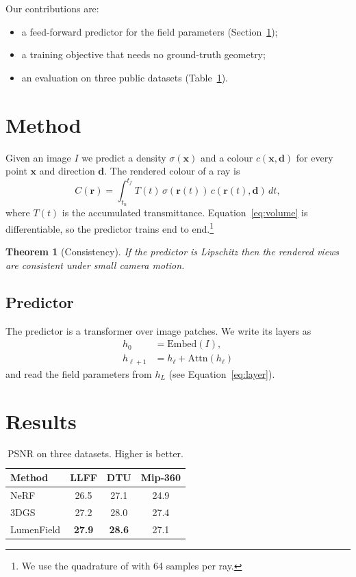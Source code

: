 \documentclass[sigconf]{acmart}
\newcommand{\ours}{LumenField}
\newcommand{\vect}[1]{\mathbf{#1}}
\newtheorem{theorem}{Theorem}
\begin{document}
Our contributions are:
\begin{itemize}
  \item a feed-forward predictor for the field parameters (Section~\ref{sec:method});
  \item a training objective that needs no ground-truth geometry;
  \item an evaluation on three public datasets (Table~\ref{tab:results}).
\end{itemize}

\section{Method}
\label{sec:method}

Given an image $I$ we predict a density $\sigma(\vect{x})$ and a colour
$c(\vect{x}, \vect{d})$ for every point $\vect{x}$ and direction $\vect{d}$. The
rendered colour of a ray is
\begin{equation}
  C(\mathbf{r}) = \int_{t_n}^{t_f} T(t)\,\sigma(\mathbf{r}(t))\,c(\mathbf{r}(t), \mathbf{d})\,dt,
  \label{eq:volume}
\end{equation}
where $T(t)$ is the accumulated transmittance. Equation~\eqref{eq:volume} is
differentiable, so the predictor trains end to end.\footnote{We use the quadrature
of \citet{mildenhall2020nerf} with 64 samples per ray.}

\begin{theorem}[Consistency]
  If the predictor is Lipschitz then the rendered views are consistent under small
  camera motion.
\end{theorem}

\subsection{Predictor}

The predictor is a transformer over image patches. We write its layers as
\begin{align}
  h_0 &= \mathrm{Embed}(I), \\
  h_{\ell+1} &= h_\ell + \mathrm{Attn}(h_\ell) \label{eq:layer}
\end{align}
and read the field parameters from $h_L$ (see Equation~\eqref{eq:layer}).

\section{Results}

\begin{table}
  \caption{PSNR on three datasets. Higher is better.}
  \label{tab:results}
  \begin{tabular}{lccc}
    \toprule
    Method & LLFF & DTU & Mip-360 \\
    \midrule
    NeRF & 26.5 & 27.1 & 24.9 \\
    3DGS & 27.2 & 28.0 & 27.4 \\
    \ours{} & \textbf{27.9} & \textbf{28.6} & 27.1 \\
    \bottomrule
  \end{tabular}
\end{table}
\end{document}

